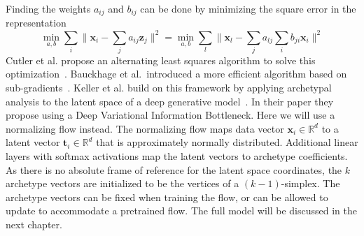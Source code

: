 Finding the weights $a_{ij}$ and $b_{ij}$ can be done by minimizing the square
error in the representation
\begin{equation}
        \label{eq:archetype_rss}
        \min_{a,b} \sum_i \lVert \mathbf{x}_i - \sum_j a_{ij} \mathbf{z}_j
        \rVert^2
        = \min_{a,b} \sum_l \lVert \mathbf{x}_l - \sum_j a_{lj} \sum_i
        b_{ji} \mathbf{x}_i \rVert^2
\end{equation}
Cutler et al. propose an alternating least squares algorithm to solve this
optimization~\citep{cutlerArchetypalAnalysis1994}.  Bauckhage et al.\ introduced
a more efficient algorithm based on
sub-gradients~\citep{bauckhageArchetypalAnalysisAutoencoder2015}. Keller et al.
build on this framework by applying archetypal analysis to the latent space of
a deep generative model~\citep{kellerLearningExtremalRepresentations2020}. In
their paper they propose using a Deep Variational Information Bottleneck. Here
we will use a normalizing flow instead. The normalizing flow maps data vector
$\mathbf{x}_i \in \mathbb{R}^d$ to a latent vector $\mathbf{t}_i \in
\mathbb{R}^d$ that is approximately normally distributed. Additional linear
layers with softmax activations map the latent vectors to archetype
coefficients. As there is no absolute frame of reference for the latent space
coordinates, the $k$ archetype vectors are initialized to be the vertices of a
$(k-1)$-simplex. The archetype vectors can be fixed when training the flow, or
can be allowed to update to accommodate a pretrained flow. The full model will
be discussed in the next chapter.
